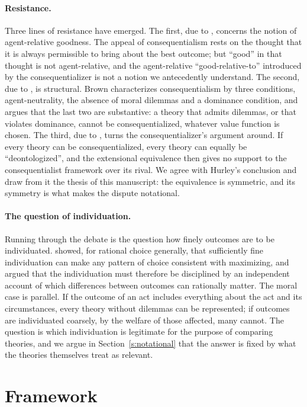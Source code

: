 \documentclass{situationist-preprint}
\begin{document}
\paragraph{Resistance.} Three lines of resistance have emerged. The first, due to \citet{Schroeder2007}, concerns the notion of agent-relative goodness. The appeal of consequentialism rests on the thought that it is always permissible to bring about the best outcome; but ``good'' in that thought is not agent-relative, and the agent-relative ``good-relative-to'' introduced by the consequentializer is not a notion we antecedently understand. The second, due to \citet{Brown2011}, is structural. Brown characterizes consequentialism by three conditions, agent-neutrality, the absence of moral dilemmas and a dominance condition, and argues that the last two are substantive: a theory that admits dilemmas, or that violates dominance, cannot be consequentialized, whatever value function is chosen. The third, due to \citet{Hurley2013}, turns the consequentializer's argument around. If every theory can be consequentialized, every theory can equally be ``deontologized'', and the extensional equivalence then gives no support to the consequentialist framework over its rival. We agree with Hurley's conclusion and draw from it the thesis of this manuscript: the equivalence is symmetric, and its symmetry is what makes the dispute notational.

\paragraph{The question of individuation.} Running through the debate is the question how finely outcomes are to be individuated. \citet[ch.~5]{Broome1991} showed, for rational choice generally, that sufficiently fine individuation can make any pattern of choice consistent with maximizing, and argued that the individuation must therefore be disciplined by an independent account of which differences between outcomes can rationally matter. The moral case is parallel. If the outcome of an act includes everything about the act and its circumstances, every theory without dilemmas can be represented; if outcomes are individuated coarsely, by the welfare of those affected, many cannot. The question is which individuation is legitimate for the purpose of comparing theories, and we argue in Section~\ref{s:notational} that the answer is fixed by what the theories themselves treat as relevant.

\section{Framework}\label{s:framework}
\end{document}
